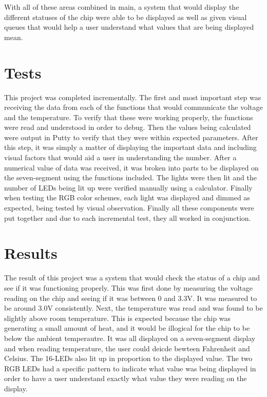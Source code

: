 \documentclass[11pt]{article}
\begin{document}
\quad With all of these areas combined in main, a system that would display the different statuses of the chip were able to be displayed as well as given visual queues that would help a user understand what values that are being displayed mean. 
 
\section{Tests}
\quad This project was completed incrementally. The first and most important step was receiving the data from each of the functions that would communicate the voltage and the temperature. To verify that these were working properly, the functions were read and understood in order to debug. Then the values being calculated were output in Putty to verify that they were within expected parameters. After this step, it was simply a matter of displaying the important data and including visual factors that would aid a user in understanding the number. After a numerical value of data was received, it was broken into parts to be displayed on the seven-segment using the functions included. The lights were then lit and the number of LEDs being lit up were verified manually using a calculator. Finally when testing the RGB color schemes, each light was displayed and dimmed as expected, being tested by visual observation. Finally all these components were put together and due to each incremental test, they all worked in conjunction. 
\\
\section{Results}
\quad The result of this project was a system that would check the status of a chip and see if it was functioning properly. This was first done by measuring the voltage reading on the chip and seeing if it was between 0 and 3.3V. It was measured to be around 3.0V consistently. Next, the temperature was read and was found to be slightly above room temperature. This is expected because the chip was generating a small amount of heat, and it would be illogical for the chip to be below the ambient temperautre. It was all displayed on a seven-segment display and when reading temperature, the user could deicde bewteen Fahrenheit and Celsius. The 16-LEDs also lit up in proportion to the displayed value. The two RGB LEDs had a specific pattern to indicate what value was being displayed in order to have a user understand exactly what value they were reading on the display. 
\\
\end{document}
